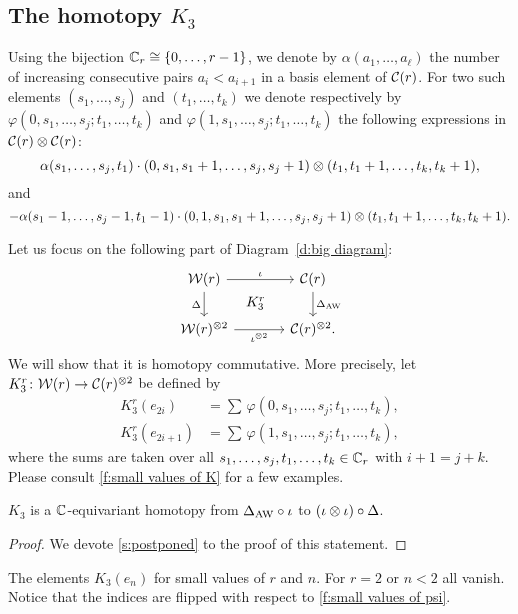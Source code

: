 \subsection{The homotopy $K_3$}\label{ss:coproduct}

Using the bijection $\mathbb{C}_r \cong \{0,\dots,r-1\}$, we denote by $\alpha(a_1,\dots,a_\ell)$ the number of increasing consecutive pairs $a_i < a_{i+1}$ in a basis element of $\mathcal{C}(r)$.
For two such elements $(s_1,\dots,s_j)$ and $(t_1,\dots,t_k)$ we denote respectively by $\varphi(0,s_1,\dots,s_j;t_1,\dots,t_k)$ and $\varphi(1,s_1,\dots,s_j;t_1,\dots,t_k)$ the following expressions in $\mathcal{C}(r) \otimes \mathcal{C}(r)$:
\[
\alpha(s_1,\dots,s_j,t_1) \cdot
(0,s_1,s_1+1,\dots,s_j,s_j+1) \otimes
(t_1,t_1+1,\dots,t_k,t_k+1),
\]
and
\[
- \alpha(s_1-1,\dots,s_j-1,t_1-1) \cdot
(0,1,s_1,s_1+1,\dots,s_j,s_j+1)\otimes (t_1,t_1+1,\dots,t_k,t_k+1).
\]

Let us focus on the following part of Diagram~\eqref{d:big diagram}:
\[
\begin{tikzcd}[column sep=large]
	\cW(r) \arrow[r,"\iota"] \arrow[d,"\Delta"'] \arrow[dr,phantom,"K^r_3"]&
	\cC(r) \arrow[d,"\Delta_{\AW}"] \\
	\cW(r)^{\ot 2} \arrow[r,"\iota^{\ot 2}"'] &
	\cC(r)^{\ot 2}.
\end{tikzcd}
\]
We will show that it is homotopy commutative.
More precisely, let $K_3^r \colon \mathcal{W}(r) \to \mathcal{C}(r)^{\otimes 2}$ be defined by
\[
\begin{split}
	K_3^r(e_{2i}) &= \sum \, \varphi(0,s_1,\dots,s_j;t_1,\dots,t_k), \\
	K_3^r(e_{2i+1}) &= \sum \, \varphi(1,s_1,\dots,s_j;t_1,\dots,t_k),
\end{split}
\]
where the sums are taken over all $s_1,\dots,s_j,t_1,\dots,t_k \in \mathbb{C}_r$ with $i+1 = j+k$.
Please consult \cref{f:small values of K} for a few examples.

\begin{lemma}\label{l:K3}
	$K_3$ is a $\mathbb{C}$-equivariant homotopy from $\Delta_{\operatorname{AW}} \mathbin{\circ} \iota$ to $(\iota \otimes \iota) \mathbin{\circ} \Delta$.
\end{lemma}

\begin{proof}
	We devote \cref{s:postponed} to the proof of this statement.
\end{proof}

\begin{table}
	\centering
	
	\caption{The elements $K_3(e_n)$ for small values of $r$ and $n$. For $r=2$ or $n<2$ all vanish. Notice that the indices are flipped with respect to \cref{f:small values of psi}.}
	\label{f:small values of K}
\end{table}

